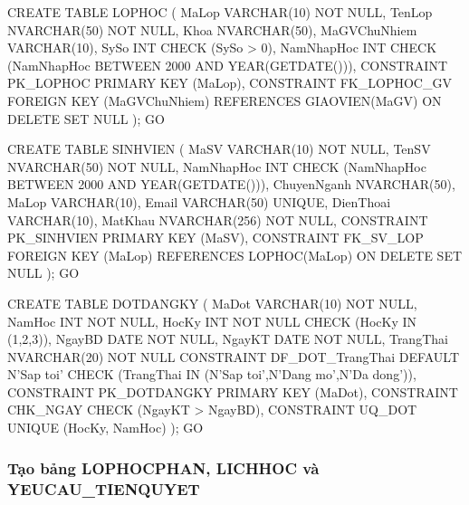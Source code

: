 \documentclass[13pt, a4paper]{article}
\begin{document}
\begin{sqlbox}
CREATE TABLE LOPHOC (
    MaLop        VARCHAR(10)  NOT NULL,
    TenLop       NVARCHAR(50) NOT NULL,
    Khoa         NVARCHAR(50),
    MaGVChuNhiem VARCHAR(10),
    SySo         INT          CHECK (SySo > 0),
    NamNhapHoc   INT          CHECK (NamNhapHoc BETWEEN 2000 AND YEAR(GETDATE())),
    CONSTRAINT PK_LOPHOC    PRIMARY KEY (MaLop),
    CONSTRAINT FK_LOPHOC_GV FOREIGN KEY (MaGVChuNhiem)
        REFERENCES GIAOVIEN(MaGV) ON DELETE SET NULL
);
GO

CREATE TABLE SINHVIEN (
    MaSV        VARCHAR(10)   NOT NULL,
    TenSV       NVARCHAR(50)  NOT NULL,
    NamNhapHoc  INT           CHECK (NamNhapHoc BETWEEN 2000 AND YEAR(GETDATE())),
    ChuyenNganh NVARCHAR(50),
    MaLop       VARCHAR(10),
    Email       VARCHAR(50)   UNIQUE,
    DienThoai   VARCHAR(10),
    MatKhau     NVARCHAR(256) NOT NULL,
    CONSTRAINT PK_SINHVIEN PRIMARY KEY (MaSV),
    CONSTRAINT FK_SV_LOP   FOREIGN KEY (MaLop)
        REFERENCES LOPHOC(MaLop) ON DELETE SET NULL
);
GO

CREATE TABLE DOTDANGKY (
    MaDot     VARCHAR(10)  NOT NULL,
    NamHoc    INT          NOT NULL,
    HocKy     INT          NOT NULL CHECK (HocKy IN (1,2,3)),
    NgayBD    DATE         NOT NULL,
    NgayKT    DATE         NOT NULL,
    TrangThai NVARCHAR(20) NOT NULL
              CONSTRAINT DF_DOT_TrangThai DEFAULT N'Sap toi'
              CHECK (TrangThai IN (N'Sap toi',N'Dang mo',N'Da dong')),
    CONSTRAINT PK_DOTDANGKY PRIMARY KEY (MaDot),
    CONSTRAINT CHK_NGAY     CHECK (NgayKT > NgayBD),
    CONSTRAINT UQ_DOT       UNIQUE (HocKy, NamHoc)
);
GO
\end{sqlbox}

\subsubsection{Tạo bảng LOPHOCPHAN, LICHHOC và YEUCAU\_TIENQUYET}
\end{document}
